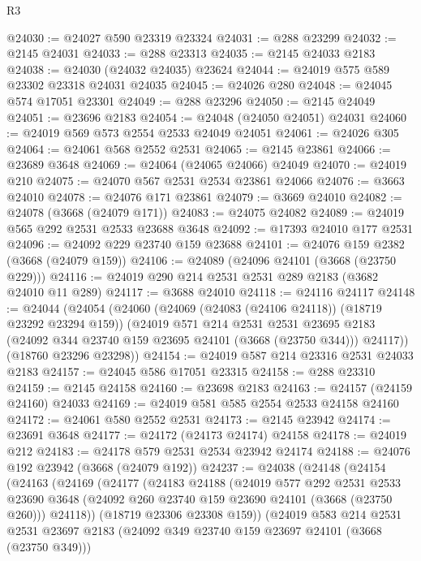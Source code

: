 \begin{lexlean}{R3}
\begin{coremodule}
@24030 := @24027 @590 @23319 @23324
@24031 := @288 @23299
@24032 := @2145 @24031
@24033 := @288 @23313
@24035 := @2145 @24033 @2183
@24038 := @24030 (@24032 @24035) @23624
@24044 := @24019 @575 @589 @23302 @23318 @24031 @24035
@24045 := @24026 @280
@24048 := @24045 @574 @17051 @23301
@24049 := @288 @23296
@24050 := @2145 @24049
@24051 := @23696 @2183
@24054 := @24048 (@24050 @24051) @24031
@24060 := @24019 @569 @573 @2554 @2533 @24049 @24051
@24061 := @24026 @305
@24064 := @24061 @568 @2552 @2531
@24065 := @2145 @23861
@24066 := @23689 @3648
@24069 := @24064 (@24065 @24066) @24049
@24070 := @24019 @210
@24075 := @24070 @567 @2531 @2534 @23861 @24066
@24076 := @3663 @24010
@24078 := @24076 @171 @23861
@24079 := @3669 @24010
@24082 := @24078 (@3668 (@24079 @171))
@24083 := @24075 @24082
@24089 := @24019 @565 @292 @2531 @2533 @23688 @3648
@24092 := @17393 @24010 @177 @2531
@24096 := @24092 @229 @23740 @159 @23688
@24101 := @24076 @159 @2382 (@3668 (@24079 @159))
@24106 := @24089 (@24096 @24101 (@3668 (@23750 @229)))
@24116 := @24019 @290 @214 @2531 @2531 @289 @2183 (@3682 @24010 @11 @289)
@24117 := @3688 @24010
@24118 := @24116 @24117
@24148 := @24044
    (@24054
      (@24060
        (@24069 (@24083 (@24106 @24118)) (@18719 @23292 @23294 @159))
        (@24019
          @571
          @214
          @2531
          @2531
          @23695
          @2183
          (@24092 @344 @23740 @159 @23695 @24101 (@3668 (@23750 @344)))
          @24117))
      (@18760 @23296 @23298))
@24154 := @24019 @587 @214 @23316 @2531 @24033 @2183
@24157 := @24045 @586 @17051 @23315
@24158 := @288 @23310
@24159 := @2145 @24158
@24160 := @23698 @2183
@24163 := @24157 (@24159 @24160) @24033
@24169 := @24019 @581 @585 @2554 @2533 @24158 @24160
@24172 := @24061 @580 @2552 @2531
@24173 := @2145 @23942
@24174 := @23691 @3648
@24177 := @24172 (@24173 @24174) @24158
@24178 := @24019 @212
@24183 := @24178 @579 @2531 @2534 @23942 @24174
@24188 := @24076 @192 @23942 (@3668 (@24079 @192))
@24237 := @24038
    (@24148
      (@24154
        (@24163
          (@24169
            (@24177
              (@24183
                @24188
                (@24019
                  @577
                  @292
                  @2531
                  @2533
                  @23690
                  @3648
                  (@24092 @260 @23740 @159 @23690 @24101 (@3668 (@23750 @260)))
                  @24118))
              (@18719 @23306 @23308 @159))
            (@24019
              @583
              @214
              @2531
              @2531
              @23697
              @2183
              (@24092 @349 @23740 @159 @23697 @24101 (@3668 (@23750 @349)))

\end{coremodule}
\end{lexlean}
